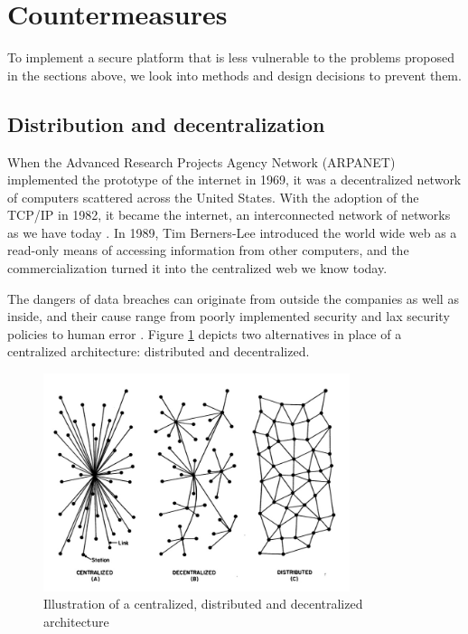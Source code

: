 \section{Countermeasures}
To implement a secure platform that is less vulnerable to the problems proposed in the sections above, we look into methods and design decisions to prevent them.
\subsection{Distribution and decentralization}
When the Advanced Research Projects Agency Network (ARPANET) implemented the prototype of the internet in 1969, it was a decentralized network of computers scattered across the United States. With the adoption of the TCP/IP in 1982, it became the internet, an interconnected network of networks as we have today \cite{DBLP:books/daglib/0006297}.
In 1989, Tim Berners-Lee introduced the world wide web as a read-only means of accessing information from other computers, and the commercialization turned it into the centralized web we know today. 

The dangers of data breaches can originate from outside the companies as well as inside, and their cause range from poorly implemented security and lax security policies to human error \cite{riskbasedsecurity}.
Figure \ref{fig:comparison} depicts two alternatives in place of a centralized architecture: distributed and decentralized.

\begin{figure}[htpb]
  \centering
  \includegraphics[width=0.8\textwidth]{figures/comparison.jpg}
  \caption{Illustration of a centralized, distributed and decentralized architecture \cite{distributed}} 
  \label{fig:comparison}
\end{figure}

